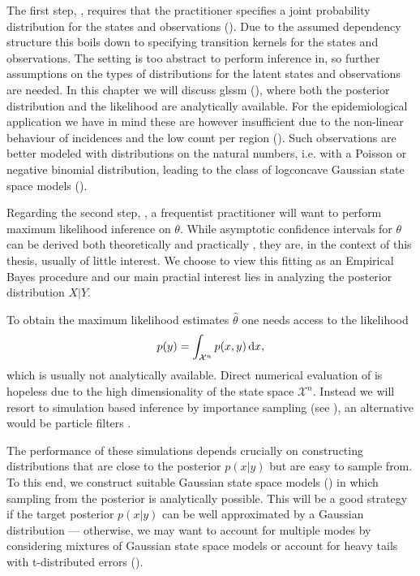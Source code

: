 The first step, , requires that the practitioner specifies a joint probability distribution for the states and observations ().
Due to the assumed dependency structure this boils down to specifying transition kernels for the states and observations.
The setting  is too abstract to perform inference in, so further assumptions on the types of distributions for the latent states and observations are needed.
In this chapter we will discuss \gls{glssm}  (), where both the posterior distribution and the likelihood are analytically available. For the epidemiological application we have in mind these are however insufficient due to the non-linear behaviour of incidences and the low count per region ().
Such observations are better modeled with distributions on the natural numbers, i.e. with a Poisson or negative binomial distribution, leading to the class of logconcave Gaussian state space models ().

Regarding the second step, , a frequentist practitioner will want to perform maximum likelihood inference on $\theta$.
While asymptotic confidence intervals for $\theta$ can be derived both theoretically and practically \cite[Chapter 7]{Durbin2012Time}, they are, in the context of this thesis, usually of little interest.
We choose to view this fitting as an Empirical Bayes procedure and our main practial interest lies in analyzing the posterior distribution $X|Y$.

To obtain the maximum likelihood estimates $\hat\theta$ one needs access to the likelihood
\begin{align}
    \label{eq:likelihood}
    p(y) = \int_{\mathcal X^n} p(x,y) \,\mathrm d x,
\end{align}
which is usually not analytically available.
Direct numerical evaluation of  is hopeless due to the high dimensionality of the state space $\mathcal X^n$.
Instead we will resort to simulation based inference by importance sampling (see ), an alternative would be particle filters \cite{Chopin2020Introduction}.

The performance of these simulations depends crucially on constructing distributions that are close to the posterior $p(x|y)$ but are easy to sample from. To this end, we construct suitable Gaussian state space models () in which sampling from the posterior is analytically possible.
This will be a good strategy if the target posterior $p(x|y)$ can be well approximated by a Gaussian distribution --- otherwise, we may want to account for multiple modes by considering mixtures of Gaussian state space models or account for heavy tails with t-distributed errors ().

